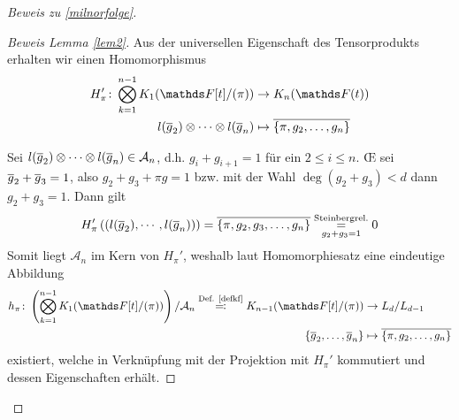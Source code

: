 \documentclass[ngerman,fontsize=11pt, paper=a4, parskip=half, titlepage=true, toc=bib]{scrartcl}
\begin{document}
\begin{proof}[Beweis zu \ref{milnorfolge}]
\begin{proof}[Beweis Lemma \ref{lem2}]
    Aus der universellen Eigenschaft des Tensorprodukts erhalten wir
    einen Homomorphismus
    \begin{align*}
      H_\pi'\colon\bigotimes_{k=1}^{n-1}\K_1(\Ftpi)
      &\to\KnFt\\
      l(\ov g_2)\otimes\dotsb\otimes l(\ov g_n)
      &\mapsto \ov{\{\pi,g_2,\dotsc,g_n\}}
    \end{align*}
    
    Sei $l(\overline g_2)\otimes\dotsb\otimes l(\overline g_n)\in\mathcal{A}_n$,
    d.h. $g_i+g_{i+1}=1$ für ein $2\leq i\leq n$.
    \OE{} sei $\overline g_2 + \overline g_3=1$, 
    also $g_2 + g_3 +\pi g=1$ bzw. mit der Wahl
    $\deg(g_2+g_3)<d$ dann $g_2+g_3=1$. Dann gilt
    \begin{gather*}
      H'_\pi\left(\left(l(\overline g_2),\dotsb,l(\overline g_n)\right)\right)
      = \overline{\{\pi,g_2,g_3, \dotsc,g_n\}}
      \overset{\text{Steinbergrel.}}{\underset{g_2+g_3=1}{=}} 0
    \end{gather*}
    Somit liegt $\mathcal{A}_n$ im Kern von $H_\pi'$, weshalb laut
    Homomorphiesatz eine eindeutige Abbildung
    \begin{align*}
      h_\pi\colon 
      \left(\bigotimes_{k=1}^{n-1}\K_1(\Ftpi)\right)/\mathcal{A}_n
      \overset{\text{Def. \ref{defkf}}}{\eqqcolon}
      \K_{n-1}(\Ftpi)&\to L_d/L_{d-1}\\
      \{\ov g_2,\dotsc,\ov g_n\}&\mapsto \ov{\{\pi,g_2,\dotsc,g_n\}}
    \end{align*}
    existiert, welche in Verknüpfung mit der Projektion mit 
    $H_\pi'$ kommutiert und dessen Eigenschaften erhält.


\end{proof}
\end{proof}
\end{document}
